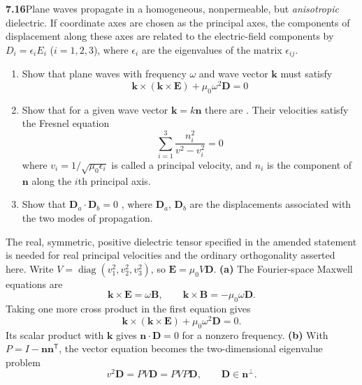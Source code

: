 \par\bigskip
\noindent\textbf{7.16}\quad Plane waves propagate in a homogeneous, nonpermeable, but \emph{anisotropic} dielectric.  If coordinate axes are chosen as the principal axes, the components of displacement along these axes are related to the electric-field components by $D_{i}=\epsilon_{i}E_{i}$ ($i=1,2,3$), where $\epsilon_{i}$ are the eigenvalues of the matrix $\epsilon_{ij}$.
\begin{enumerate}
\item[(a)] Show that plane waves with frequency $\omega$ and wave vector $\mathbf{k}$ must satisfy
\[
\mathbf{k}\times(\mathbf{k}\times\mathbf{E})+\mu_{0}\omega^{2}\mathbf{D}=0
\]
\item[(b)] Show that for a given wave vector $\mathbf{k}=k\mathbf{n}$ there are . Their velocities satisfy the Fresnel equation 
\[
\sum_{i=1}^{3}\frac{n_{i}^{2}}{v^{2}-v_{i}^{2}}=0
\]
where $v_{i}=1/\sqrt{\mu_{0}\epsilon_{i}}$ is called a principal velocity, and $n_{i}$ is the component of $\mathbf{n}$ along the $i$th principal axis.
\item[(c)] Show that $\mathbf{D}_{a}\cdot\mathbf{D}_{b}=0$ , where $\mathbf{D}_{a}$, $\mathbf{D}_{b}$ are the displacements associated with the two modes of propagation.
\end{enumerate}
\solution
The real, symmetric, positive dielectric tensor specified in the
amended statement is needed for real principal velocities and the
ordinary orthogonality asserted here. Write
$V=\operatorname{diag}(v_1^2,v_2^2,v_3^2)$, so
$\mathbf E=\mu_0 V\mathbf D$.
\textbf{(a)} The Fourier-space Maxwell equations are
\[
\mathbf k\times\mathbf E=\omega\mathbf B,\qquad
\mathbf k\times\mathbf B=-\mu_0\omega\mathbf D.
\]
Taking one more cross product in the first equation gives
\[
\boxed{\mathbf k\times(\mathbf k\times\mathbf E)
+\mu_0\omega^2\mathbf D=0.}
\]
Its scalar product with $\mathbf k$ gives
$\mathbf n\cdot\mathbf D=0$ for a nonzero frequency.
\textbf{(b)} With $P=I-\mathbf n\mathbf n^{\mathsf T}$, the vector
equation becomes the two-dimensional eigenvalue problem
\[
v^2\mathbf D=PV\mathbf D=PVP\mathbf D,
\qquad \mathbf D\in\mathbf n^\perp.
\]
